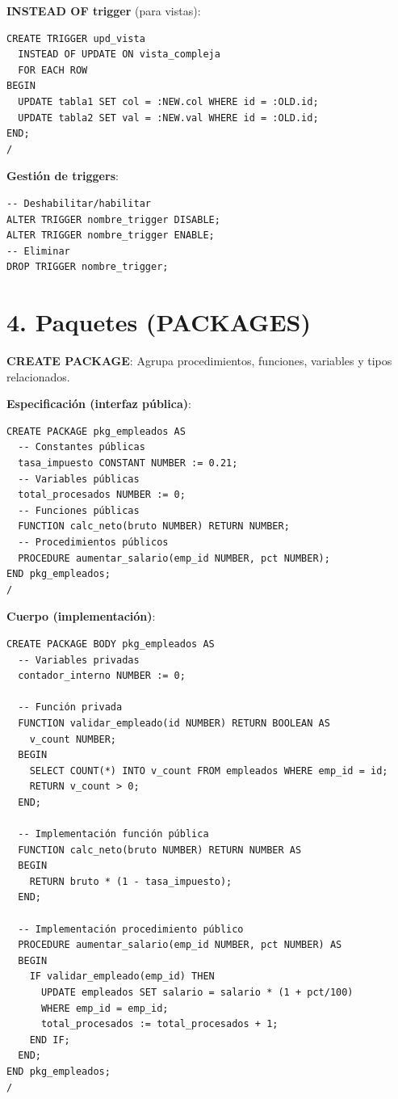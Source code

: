 \documentclass[8pt,a4paper,twocolumn]{article}
\begin{document}
\textbf{INSTEAD OF trigger} (para vistas):
\begin{lstlisting}
CREATE TRIGGER upd_vista
  INSTEAD OF UPDATE ON vista_compleja
  FOR EACH ROW
BEGIN
  UPDATE tabla1 SET col = :NEW.col WHERE id = :OLD.id;
  UPDATE tabla2 SET val = :NEW.val WHERE id = :OLD.id;
END;
/
\end{lstlisting}

\textbf{Gestión de triggers}:
\begin{lstlisting}
-- Deshabilitar/habilitar
ALTER TRIGGER nombre_trigger DISABLE;
ALTER TRIGGER nombre_trigger ENABLE;
-- Eliminar
DROP TRIGGER nombre_trigger;
\end{lstlisting}

\section*{4. Paquetes (PACKAGES)}

\textbf{CREATE PACKAGE}: Agrupa procedimientos, funciones, variables y tipos relacionados.

\textbf{Especificación (interfaz pública)}:
\begin{lstlisting}
CREATE PACKAGE pkg_empleados AS
  -- Constantes públicas
  tasa_impuesto CONSTANT NUMBER := 0.21;
  -- Variables públicas
  total_procesados NUMBER := 0;
  -- Funciones públicas
  FUNCTION calc_neto(bruto NUMBER) RETURN NUMBER;
  -- Procedimientos públicos
  PROCEDURE aumentar_salario(emp_id NUMBER, pct NUMBER);
END pkg_empleados;
/
\end{lstlisting}

\textbf{Cuerpo (implementación)}:
\begin{lstlisting}
CREATE PACKAGE BODY pkg_empleados AS
  -- Variables privadas
  contador_interno NUMBER := 0;
  
  -- Función privada
  FUNCTION validar_empleado(id NUMBER) RETURN BOOLEAN AS
    v_count NUMBER;
  BEGIN
    SELECT COUNT(*) INTO v_count FROM empleados WHERE emp_id = id;
    RETURN v_count > 0;
  END;
  
  -- Implementación función pública
  FUNCTION calc_neto(bruto NUMBER) RETURN NUMBER AS
  BEGIN
    RETURN bruto * (1 - tasa_impuesto);
  END;
  
  -- Implementación procedimiento público
  PROCEDURE aumentar_salario(emp_id NUMBER, pct NUMBER) AS
  BEGIN
    IF validar_empleado(emp_id) THEN
      UPDATE empleados SET salario = salario * (1 + pct/100)
      WHERE emp_id = emp_id;
      total_procesados := total_procesados + 1;
    END IF;
  END;
END pkg_empleados;
/
\end{lstlisting}
\end{document}
